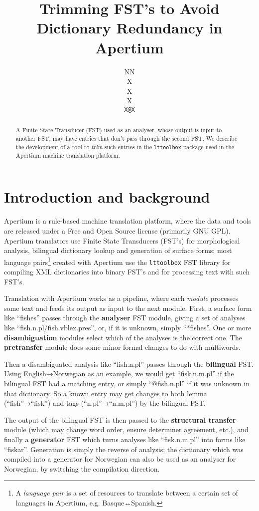 \documentclass[11pt]{article}
\author{NN\\  X \\ X \\  X \\  {\tt \small   X@X}}
\title{Trimming FST's to Avoid Dictionary Redundancy in Apertium} %
\begin{document}
\maketitle

\begin{abstract}
  A Finite State Transducer (FST) used as an analyser, whose output is
  input to another FST, may have entries that don't pass through the
  second FST. We describe the development of a tool to \emph{trim}
  such entries in the \texttt{lttoolbox} package used in the Apertium
  machine translation platform.
\end{abstract}

\section{Introduction and background}
Apertium is a rule-based machine translation platform, where the data
and tools are released under a Free and Open Source license (primarily
GNU GPL). Apertium translators use Finite State Transducers (FST's)
for morphological analysis, bilingual dictionary lookup and generation
of surface forms; most language pairs\footnote{A \emph{language pair}
  is a set of resources to translate between a certain set of
  languages in Apertium, e.g. Basque↔Spanish.} created with Apertium
use the \texttt{lttoolbox} FST library for compiling XML dictionaries
into binary FST's and for processing text with such FST's.


Translation with Apertium works as a pipeline, where each
\emph{module} processes some text and feeds its output as input to the
next module. First, a surface form like ``fishes'' passes through the
\textbf{analyser} FST module, giving a set of analyses like
``fish.n.pl/fish.vblex.pres'', or, if it is unknown, simply
``*fishes''. One or more \textbf{disambiguation} modules select which
of the analyses is the correct one. The \textbf{pretransfer} module
does some minor formal changes to do with multiwords.

Then a disambiguated analysis like ``fish.n.pl'' passes through the
\textbf{bilingual} FST. Using English→Norwegian as an example, we
would get ``fisk.n.m.pl'' if the bilingual FST had a matching entry,
or simply ``@fish.n.pl'' if it was unknown in that dictionary. So a
known entry may get changes to both lemma (``fish''→``fisk'') and tags
(``n.pl''→``n.m.pl'') by the bilingual FST.

The output of the bilingual FST is then passed to the
\textbf{structural transfer} module (which may change word order,
ensure determiner agreement, etc.), and finally a \textbf{generator}
FST which turns analyses like ``fisk.n.m.pl'' into forms like
``fiskar''. Generation is simply the reverse of analysis; the
dictionary which was compiled into a generator for Norwegian can also
be used as an analyser for Norwegian, by switching the compilation
direction.
\end{document}
